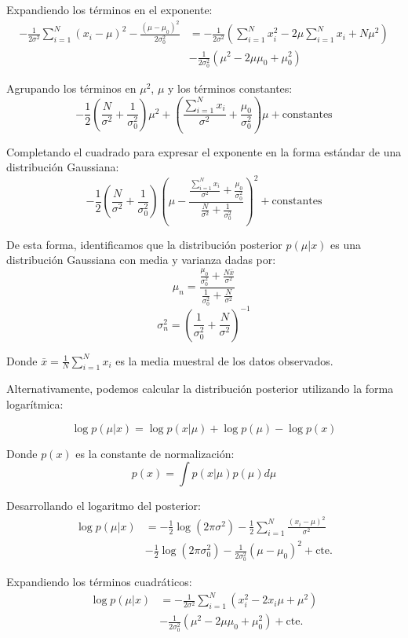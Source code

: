 Expandiendo los términos en el exponente:
\begin{align*}
-\frac{1}{2\sigma^2}\sum_{i=1}^{N}(x_i - \mu)^2 - \frac{(\mu - \mu_0)^2}{2\sigma_0^2} &= -\frac{1}{2\sigma^2}\left(\sum_{i=1}^{N}x_i^2 - 2\mu\sum_{i=1}^{N}x_i + N\mu^2\right) \\
&- \frac{1}{2\sigma_0^2}(\mu^2 - 2\mu\mu_0 + \mu_0^2)
\end{align*}

Agrupando los términos en \(\mu^2\), \(\mu\) y los términos constantes:
\[-\frac{1}{2}\left(\frac{N}{\sigma^2} + \frac{1}{\sigma_0^2}\right)\mu^2 + \left(\frac{\sum_{i=1}^{N}x_i}{\sigma^2} + \frac{\mu_0}{\sigma_0^2}\right)\mu + \text{constantes}\]

Completando el cuadrado para expresar el exponente en la forma estándar de una distribución Gaussiana:
\[-\frac{1}{2}\left(\frac{N}{\sigma^2} + \frac{1}{\sigma_0^2}\right)\left(\mu - \frac{\frac{\sum_{i=1}^{N}x_i}{\sigma^2} + \frac{\mu_0}{\sigma_0^2}}{\frac{N}{\sigma^2} + \frac{1}{\sigma_0^2}}\right)^2 + \text{constantes}\]

De esta forma, identificamos que la distribución posterior \(p(\mu|x)\) es una distribución Gaussiana con media y varianza dadas por:
\[\mu_n = \frac{\frac{\mu_0}{\sigma_0^2} + \frac{N\bar{x}}{\sigma^2}}{\frac{1}{\sigma_0^2} + \frac{N}{\sigma^2}}\]
\[\sigma_n^2 = \left(\frac{1}{\sigma_0^2} + \frac{N}{\sigma^2}\right)^{-1}\]

Donde \(\bar{x} = \frac{1}{N}\sum_{i=1}^{N}x_i\) es la media muestral de los datos observados.

Alternativamente, podemos calcular la distribución posterior utilizando la forma logarítmica:


\[\log p(\mu|x)=\log p(x|\mu) + \log p(\mu) - \log p(x)\]

Donde \(p(x)\) es la constante de normalización:
\[p(x)=\int p(x|\mu)p(\mu) d\mu\]

Desarrollando el logaritmo del posterior:
\begin{align*}
\log p(\mu|x) &= -\frac{1}{2}\log(2\pi\sigma^2) - \frac{1}{2}\sum_{i=1}^{N}\frac{(x_i-\mu)^2}{\sigma^2} \\
&-\frac{1}{2}\log(2\pi\sigma_{0}^2) - \frac{1}{2\sigma_{0}^2}(\mu-\mu_{0})^2 + \text{cte.}
\end{align*}

Expandiendo los términos cuadráticos:
\begin{align*}
\log p(\mu|x) &= -\frac{1}{2\sigma^2}\sum_{i=1}^{N}(x_{i}^2-2x_{i}\mu+\mu^2) \\
&-\frac{1}{2\sigma_{0}^2}(\mu^2-2\mu\mu_0+\mu_{0}^2) + \text{cte.}
\end{align*}

